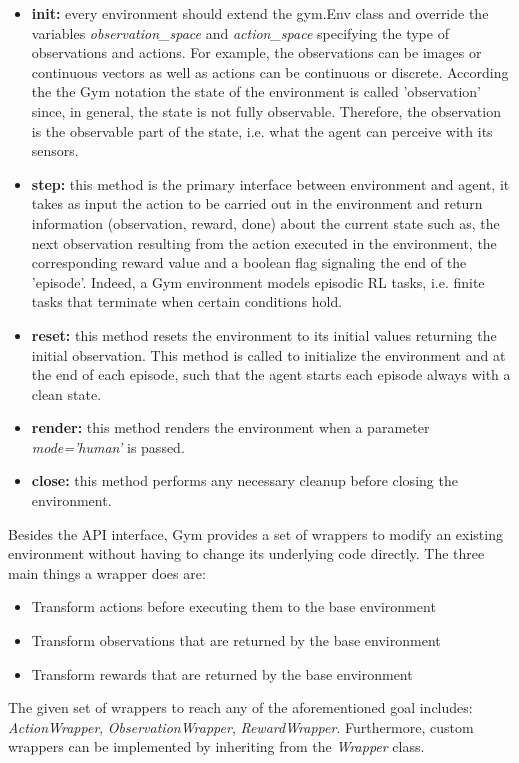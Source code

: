 \begin{itemize}
  \item \textbf{init:} every environment should extend the gym.Env class and override the variables \textit{observation\_space} and \textit{action\_space} specifying the type of observations and actions. For example, the observations can be images or continuous vectors as well as actions can be continuous or discrete. According the the Gym notation the state of the environment is called 'observation' since, in general, the state is not fully observable. Therefore, the observation is the observable part of the state, i.e. what the agent can perceive with its sensors.
  \item \textbf{step:} this method is the primary interface between environment and agent, it takes as input the action to be carried out in the environment and return information (observation, reward, done) about the current state such as, the next observation resulting from the action executed in the environment, the corresponding reward value and a boolean flag signaling the end of the 'episode'. Indeed, a Gym environment models episodic RL tasks, i.e. finite tasks that terminate when certain conditions hold.
  \item \textbf{reset:} this method resets the environment to its initial values returning the initial observation. This method is called to initialize the environment and at the end of each episode, such that the agent starts each episode always with a clean state.
  \item \textbf{render:} this method renders the environment when a parameter \textit{mode='human'} is passed.
  \item \textbf{close:} this method performs any necessary cleanup before closing the environment.
\end{itemize}
Besides the API interface, Gym provides a set of wrappers to modify an existing environment without having to change its underlying code directly. The three main things a wrapper does are:

\begin{itemize}
  \item Transform actions before executing them to the base environment
  \item Transform observations that are returned by the base environment
  \item Transform rewards that are returned by the base environment
\end{itemize}
The given set of wrappers to reach any of the aforementioned goal includes: \textit{ActionWrapper}, \textit{ObservationWrapper}, \textit{RewardWrapper}. Furthermore, custom wrappers can be implemented by inheriting from the \textit{Wrapper} class.

